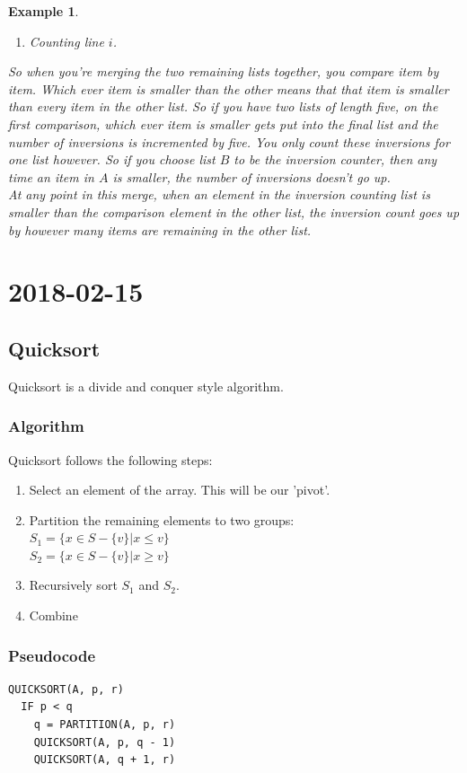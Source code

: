 \documentclass{report}
\newtheorem*{ex}{Example}
\newcommand{\mychapter}[2]{
	\setcounter{chapter}{#1}
	\setcounter{section}{0}
	\chapter*{#2}
	\addcontentsline{toc}{chapter}{#2}
}
\begin{document}
\begin{ex}
\begin{enumerate}
\item Counting line $i$.
\end{enumerate}
So when you're merging the two remaining lists together, you compare item by item. Which ever item is smaller than the other means that that item is smaller than every item in the other list. So if you have two lists of length five, on the first comparison, which ever item is smaller gets put into the final list and the number of inversions is incremented by five. You only count these inversions for one list however. So if you choose list $B$ to be the inversion counter, then any time an item in $A$ is smaller, the number of inversions doesn't go up.\\
At any point in this merge, when an element in the inversion counting list is smaller than the comparison element in the other list, the inversion count goes up by however many items are remaining in the other list.\\ 
\end{ex}

\mychapter{4}{2018-02-15}
\section{Quicksort}
Quicksort is a divide and conquer style algorithm.
\subsection{Algorithm}
Quicksort follows the following steps:
\begin{enumerate}
\item Select an element of the array. This will be our 'pivot'.
\item Partition the remaining elements to two groups:\\
$S_1 = \{x\in S - \{v\} | x\leq v\}$\\
$S_2 = \{x\in S - \{v\} | x \geq v\}$
\item Recursively sort $S_1$ and $S_2$.
\item Combine
\end{enumerate}
\subsection{Pseudocode}
\begin{verbatim}
QUICKSORT(A, p, r)
  IF p < q
    q = PARTITION(A, p, r)
    QUICKSORT(A, p, q - 1)
    QUICKSORT(A, q + 1, r)
\end{verbatim}
\end{document}
